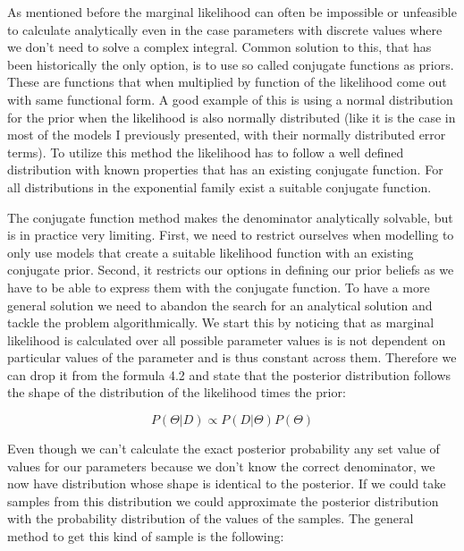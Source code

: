 \documentclass[12pt,a4paper,leqno]{report}
\theoremstyle{plain}
\theoremstyle{definition}
\theoremstyle{remark}
\begin{document}
As mentioned before the marginal likelihood can often be impossible or unfeasible to
calculate analytically even in the case parameters with discrete values where we don't
need to solve a complex integral.
Common solution to this, that has been historically the only option, is to use so called conjugate functions as priors. These are
functions that when multiplied by function of the likelihood come out
with same functional form. A good example of this is using a normal distribution
for the prior when the likelihood is also normally distributed (like it is the case in most
of the models I previously presented, with their normally distributed error terms).
To utilize this method the likelihood has to follow a well defined distribution
with known properties that has an existing conjugate function. For all distributions in
the exponential family exist a suitable conjugate function.

The conjugate function method makes the denominator analytically solvable, but is in practice very limiting.
First, we need to restrict ourselves when modelling to only use models that create a suitable likelihood function with an existing conjugate prior.
Second, it restricts our options in defining our prior beliefs as we have to be able to express them with the conjugate function.
To have a more general solution we need to abandon the search for an analytical
solution and tackle the problem algorithmically. We start this by noticing that as marginal likelihood
is calculated over all possible parameter values
is is not dependent on particular values of the parameter and is thus
constant across them. Therefore we can drop it from the formula 4.2 and state that the posterior
distribution follows the shape of the distribution of the likelihood times the prior:

\begin{def}\label{bayespropto}
\begin{equation}
P(\Theta|D) \propto P(D|\Theta)P(\Theta)
\end{equation}
\end{def}

Even though we can't calculate the exact posterior probability any set value of values for
our parameters because we don't know the correct denominator, we now have distribution whose shape
is identical to the posterior. If we could take samples from this distribution we could
approximate the posterior distribution with the probability distribution of the values of the samples.
The general method to get this kind of sample is the following:
\end{document}
